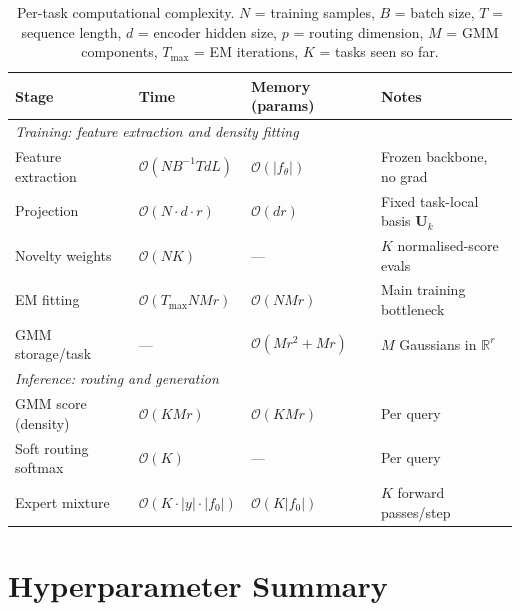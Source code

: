 \documentclass[12pt,a4paper]{article}
\begin{document}
\begin{table}[t]
\centering
\caption{Per-task computational complexity. $N$ = training samples, $B$ = batch size, $T$ = sequence length, $d$ = encoder hidden size, $p$ = routing dimension, $M$ = GMM components, $T_{\max}$ = EM iterations, $K$ = tasks seen so far.}
\label{tab:complexity}
\begin{tabular}{llll}
\toprule
Stage & Time & Memory (params) & Notes \\
\midrule
\multicolumn{4}{l}{\textit{Training: feature extraction and density fitting}} \\
\midrule
Feature extraction   & $\mathcal{O}(N B^{-1} T d L)$    & $\mathcal{O}(|f_\theta|)$     & Frozen backbone, no grad \\
Projection           & $\mathcal{O}(N \cdot d \cdot r)$  & $\mathcal{O}(dr)$             & Fixed task-local basis $\mathbf{U}_k$ \\
Novelty weights      & $\mathcal{O}(N K)$                & ---                           & $K$ normalised-score evals \\
EM fitting           & $\mathcal{O}(T_{\max} N M r)$     & $\mathcal{O}(NMr)$            & Main training bottleneck \\
GMM storage/task     & ---                               & $\mathcal{O}(Mr^2 + Mr)$      & $M$ Gaussians in $\mathbb{R}^r$ \\
\midrule
\multicolumn{4}{l}{\textit{Inference: routing and generation}} \\
\midrule
GMM score (density)  & $\mathcal{O}(K M r)$              & $\mathcal{O}(KMr)$            & Per query \\
Soft routing softmax & $\mathcal{O}(K)$                  & ---                           & Per query \\
Expert mixture       & $\mathcal{O}(K \cdot |y| \cdot |f_0|)$ & $\mathcal{O}(K|f_0|)$   & $K$ forward passes/step \\
\bottomrule
\end{tabular}
\end{table}

\section{Hyperparameter Summary}
\label{sec:hyperparams}
\end{document}
